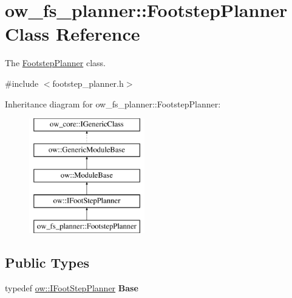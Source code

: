 \hypertarget{classow__fs__planner_1_1FootstepPlanner}{}\section{ow\+\_\+fs\+\_\+planner\+:\+:Footstep\+Planner Class Reference}
\label{classow__fs__planner_1_1FootstepPlanner}


The \hyperlink{classow__fs__planner_1_1FootstepPlanner}{Footstep\+Planner} class.  




{\ttfamily \#include $<$footstep\+\_\+planner.\+h$>$}

Inheritance diagram for ow\+\_\+fs\+\_\+planner\+:\+:Footstep\+Planner\+:\begin{figure}[H]
\begin{center}
\leavevmode
\includegraphics[height=5.000000cm]{d9/d9d/classow__fs__planner_1_1FootstepPlanner}
\end{center}
\end{figure}
\subsection*{Public Types}
\begin{DoxyCompactItemize}
\item 
typedef \hyperlink{classow_1_1IFootStepPlanner}{ow\+::\+I\+Foot\+Step\+Planner} {\bfseries Base}\hypertarget{classow__fs__planner_1_1FootstepPlanner_a400a6b7a2538f6686385fbf440467a5f}{}\label{classow__fs__planner_1_1FootstepPlanner_a400a6b7a2538f6686385fbf440467a5f}

\end{DoxyCompactItemize}
